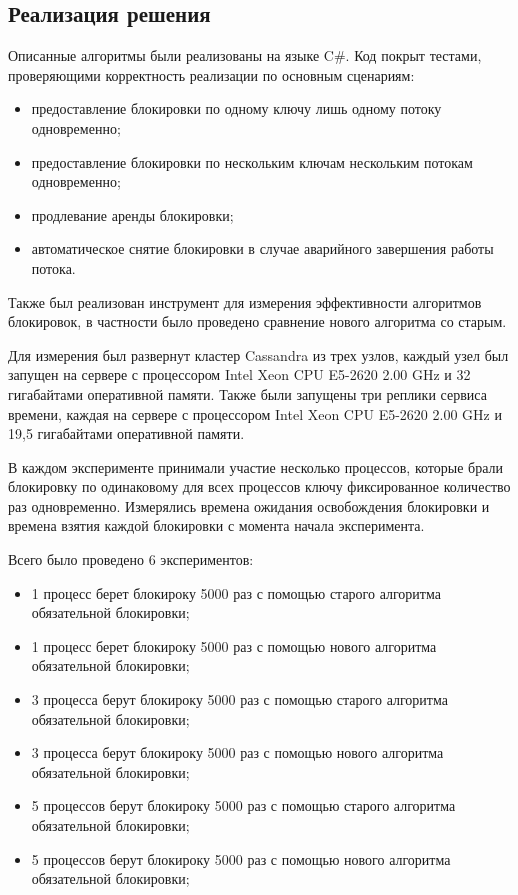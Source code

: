 \subsection{Реализация решения}

Описанные алгоритмы были реализованы на языке C\#. Код покрыт тестами, проверяющими корректность реализации по основным сценариям:
\begin{itemize}
	\item предоставление блокировки по одному ключу лишь одному потоку одновременно;
	\item предоставление блокировки по нескольким ключам нескольким потокам одновременно;
	\item продлевание аренды блокировки;
	\item автоматическое снятие блокировки в случае аварийного завершения работы потока.
\end{itemize}

Также был реализован инструмент для измерения эффективности алгоритмов блокировок, в частности было проведено сравнение нового алгоритма со старым.

Для измерения был развернут кластер Cassandra из трех узлов, каждый узел был запущен на сервере с процессором Intel Xeon CPU E5-2620 2.00 GHz и 32 гигабайтами оперативной памяти.
Также были запущены три реплики сервиса времени, каждая на сервере с процессором Intel Xeon CPU E5-2620 2.00 GHz и 19,5 гигабайтами оперативной памяти.

В каждом эксперименте принимали участие несколько процессов, которые брали блокировку по одинаковому для всех процессов ключу фиксированное количество раз одновременно.
Измерялись времена ожидания освобождения блокировки и времена взятия каждой блокировки с момента начала эксперимента.

Всего было проведено 6 экспериментов:
\begin{itemize}
	\item 1 процесс берет блокироку 5000 раз с помощью старого алгоритма обязательной блокировки;
	\item 1 процесс берет блокироку 5000 раз с помощью нового алгоритма обязательной блокировки;
	\item 3 процесса берут блокироку 5000 раз с помощью старого алгоритма обязательной блокировки;
	\item 3 процесса берут блокироку 5000 раз с помощью нового алгоритма обязательной блокировки;
	\item 5 процессов берут блокироку 5000 раз с помощью старого алгоритма обязательной блокировки;
	\item 5 процессов берут блокироку 5000 раз с помощью нового алгоритма обязательной блокировки;
\end{itemize}

